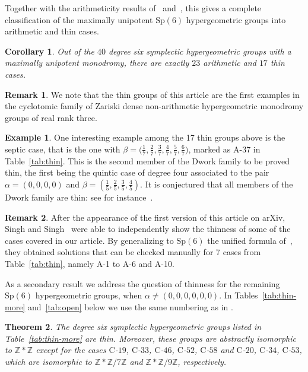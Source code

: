 \documentclass[11pt,a4paper]{amsart}
\newtheorem{thm}{Theorem}
\newtheorem{cor}[thm]{Corollary}
\theoremstyle{definition}
\newtheorem{rmk}{Remark}
\theoremstyle{definition}
\newtheorem{example}{Example}
\numberwithin{equation}{section}
\newcommand{\Sp}{\mathrm{Sp}}
\begin{document}
Together with the arithmeticity results of~\cite{bdss} and~\cite{BDN22}, this gives a complete classification of the maximally unipotent $\Sp(6)$ hypergeometric groups into arithmetic and thin cases.

\begin{cor}
Out of the $40$ degree six symplectic hypergeometric groups with a maximally unipotent monodromy, there are exactly $23$ arithmetic and $17$ thin cases.
\end{cor}

\begin{rmk}
We note that the thin groups of this article are the first examples in the cyclotomic family of Zariski dense non-arithmetic hypergeometric monodromy groups of real rank three.
\end{rmk}

\begin{example}
One interesting example among the 17 thin groups above is the septic case, that is the one with $\beta=\big(\frac{1}{7},\frac{2}{7},\frac{3}{7},\frac{4}{7},\frac{5}{7},\frac{6}{7}\big)$, marked as A-37 in Table~\ref{tab:thin}. This is the second member of the Dwork family to be proved thin, the first being the quintic case of degree four associated to the pair $\alpha=(0,0,0,0)$ and $\beta=\left(\frac{1}{5},\frac{2}{5},\frac{3}{5},\frac{4}{5}\right)$. It is conjectured that all members of the Dwork family are thin: see for instance~\cite[Sect.~3.5]{Sa14}.
\end{example}

\begin{rmk}
After the appearance of the first version of this article on arXiv, Singh and Singh~\cite{SS} were able to independently show the thinness of some of the cases covered in our article. By generalizing to $\mathrm{Sp}(6)$ the unified formula of~\cite{BT}, they obtained solutions that can be checked manually for 7 cases from Table~\ref{tab:thin}, namely A-1 to A-6 and A-10.
\end{rmk}

As a secondary result we address the question of thinness for the remaining $\Sp(6)$ hypergeometric groups, when $\alpha\neq(0,0,0,0,0,0)$.
In Tables~\ref{tab:thin-more} and~\ref{tab:open} below we use the same numbering as in \cite[Table C]{bdss}.

\begin{thm}\label{thm:total-nonmum}
The degree six symplectic hypergeometric groups listed in Table~\ref{tab:thin-more} are thin.
Moreover, these groups are abstractly isomorphic to $\mathbb{Z}\ast\mathbb{Z}$ except for the cases $\mathrm{C}$-$19$, $\mathrm{C}$-$33$, $\mathrm{C}$-$46$, $\mathrm{C}$-$52$, $\mathrm{C}$-$58$ and $\mathrm{C}$-$20$, $\mathrm{C}$-$34$, $\mathrm{C}$-$53$, which are isomorphic to $\mathbb{Z}\ast\mathbb{Z}/7\mathbb{Z}$ and $\mathbb{Z}\ast\mathbb{Z}/9\mathbb{Z}$, respectively.
\end{thm}
\end{document}
